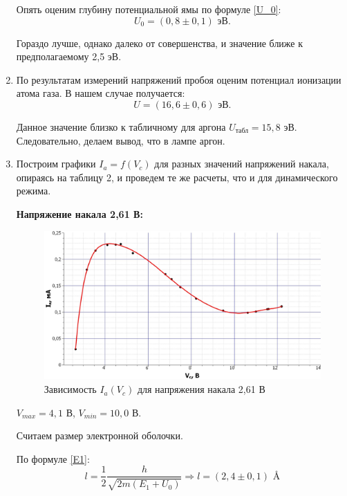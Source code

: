 \begin{enumerate}
		Опять оценим глубину потенциальной ямы по формуле \eqref{U_0}:
		\begin{equation*}
			U_0 = (0,8 \pm 0,1) \text{ эВ}.
		\end{equation*}
		
		Гораздо лучше, однако далеко от совершенства, и значение ближе к предполагаемому 2,5 эВ.
		
		\item По результатам измерений напряжений пробоя оценим потенциал ионизации атома газа. В нашем случае получается:
		\begin{equation*}
			U = (16,6 \pm 0,6) \text{ эВ.} 
		\end{equation*}
	
		Данное значение близко к табличному для аргона $U_\text{табл} = 15,8$ эВ. Следовательно, делаем вывод, что в лампе аргон.
		
		\item Построим графики $I_a = f(V_c)$ для разных значений напряжений накала, опираясь на таблицу 2, и проведем те же расчеты, что и для динамического режима.
		
		\textbf{Напряжение накала 2,61 В:}
		\begin{figure}[h!]
			\centering
			\includegraphics[width=\linewidth]{./Pictures/Ia(Vc)_261.jpg}
			\caption{Зависимость $I_a(V_c)$ для напряжения накала 2,61 В}
		\end{figure}
	
		$V_{max} = 4,1$ В, $V_{min} = 10,0$ В.
		
		Считаем размер электронной оболочки.
		
		По формуле \eqref{E1}:
		\begin{equation*}
			l = \frac{1}{2}\frac{h}{\sqrt{2m(E_1 + U_0)}} \Longrightarrow l = (2,4 \pm 0,1) \text{ \AA}
		\end{equation*}
		

\end{enumerate}
